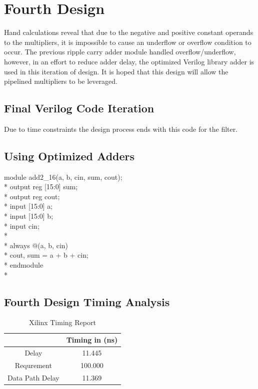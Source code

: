 \section*{Fourth Design}
Hand calculations reveal that due to the negative and positive constant operands to the multipliers, it is impossible to cause an underflow or overflow condition to occur. The previous ripple carry adder module handled overflow/underflow, however, in an effort to reduce adder delay, the optimized Verilog library adder is used in this iteration of design. It is hoped that this design will allow the pipelined multipliers to be leveraged. 
\subsection*{Final Verilog Code Iteration}
Due to time constraints the design process ends with this code for the filter. 

\subsection*{Using Optimized Adders}
module add2_16(a, b, cin, sum, cout);\\*
  output reg [15:0] sum;\\*
  output reg cout;\\*
  input [15:0] a;\\*
  input [15:0] b;\\*
  input cin;\\*
\\*
  always @(a, b, cin)\\*
    {cout, sum} = a + b + cin;\\*
endmodule\\*


\subsection*{Fourth Design Timing Analysis}

\begin{table}[bh]
\caption{Xilinx Timing Report}
\begin{tabular}{c|c}
\centering
           & Timing in (ns) \\
\hline
     Delay &   11.445  \\

Requrement &    100.000 \\

Data Path Delay & 11.369  \\
\end{tabular}  
\label{tab:timing4}
\end{table}

